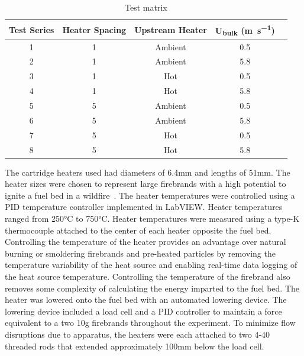         \begin{table}[hpbt]
            \normalsize
            \caption{Test matrix}
            \centering
            \begin{tabular}{ccccr}
                \rowcolor{gray!50}
               Test Series & Heater Spacing & Upstream Heater & U\textsubscript{bulk} (\si{\meter\per\second})\\
                \hline
                1   & 1 & Ambient & 0.5 \\
                2   & 1 & Ambient & 5.8 \\
                3   & 1 & Hot     & 0.5 \\
                4   & 1 & Hot     & 5.8 \\
                5   & 5 & Ambient & 0.5 \\
                6   & 5 & Ambient & 5.8 \\
                7   & 5 & Hot     & 0.5 \\
                8   & 5 & Hot     & 5.8 \\
            \end{tabular}
            \label{tab:multiHeaterConfig}
        \end{table}
    
    The cartridge heaters used had diameters of 6.4\si{\milli\meter} and lengths of 51\si{\milli\meter}. The heater sizes were chosen to represent large firebrands with a high potential to ignite a fuel bed in a wildfire~\cite{Manzello2007}. The heater temperatures were controlled using a PID temperature controller implemented in LabVIEW. Heater temperatures ranged from 250\si{\celsius} to 750\si{\celsius}. Heater temperatures were measured using a type-K thermocouple attached to the center of each heater opposite the fuel bed.
    Controlling the temperature of the heater provides an advantage over natural burning or smoldering firebrands and pre-heated particles by removing the temperature variability of the heat source and enabling real-time data logging of the heat source temperature. Controlling the temperature of the firebrand also removes some complexity of calculating the energy imparted to the fuel bed. The heater was lowered onto the fuel bed with an automated lowering device. The lowering device included a load cell and a PID controller to maintain a force equivalent to a two 10\si{\gram} firebrands throughout the experiment. To minimize flow disruptions due to apparatus, the heaters were each attached to two 4-40 threaded rods that extended approximately 100\si{\milli\meter} below the load cell. 
    
